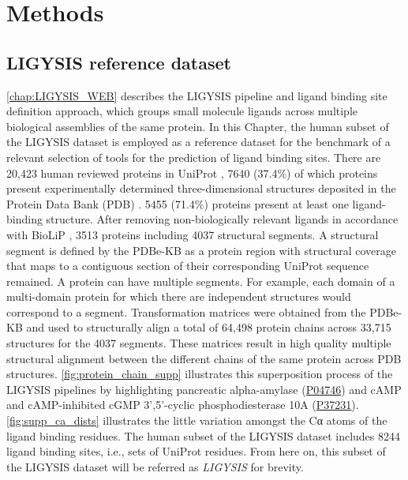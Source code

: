 \section{Methods}

\subsection{LIGYSIS reference dataset}

\autoref{chap:LIGYSIS_WEB} describes the LIGYSIS pipeline and ligand binding site definition approach, which groups small molecule ligands across multiple biological assemblies of the same protein. In this Chapter, the human subset of the LIGYSIS dataset is employed as a reference dataset for the benchmark of a relevant selection of tools for the prediction of ligand binding sites. There are 20,423 human reviewed proteins in UniProt \cite{UNIPROT_2019_UNIPROT}, 7640 (37.4\%) of which proteins present experimentally determined three-dimensional structures deposited in the Protein Data Bank (PDB) \cite{ARMSTRONG_2020_PDBE}. 5455 (71.4\%) proteins present at least one ligand-binding structure. After removing non-biologically relevant ligands in accordance with BioLiP \cite{YANG_2013_BIOLIP}, 3513 proteins including 4037 structural segments. A structural segment is defined by the PDBe-KB as a protein region with structural coverage that maps to a contiguous section of their corresponding UniProt sequence remained. A protein can have multiple segments. For example, each domain of a multi-domain protein for which there are independent structures would correspond to a segment. Transformation matrices were obtained from the PDBe-KB \cite{PDBE_2022_PDBEKB} and used to  structurally align a total of 64,498 protein chains across 33,715 structures for the 4037 segments. These matrices result in high quality multiple structural alignment between the different chains of the same protein across PDB structures. \autoref{fig:protein_chain_supp} illustrates this superposition process of the LIGYSIS pipelines by highlighting pancreatic alpha-amylase (\href{https://www.uniprot.org/uniprotkb/P04746/entry}{P04746}) and cAMP and cAMP-inhibited cGMP 3',5'-cyclic phosphodiesterase 10A (\href{https://www.uniprot.org/uniprotkb/P37231/entry}{P37231}). \autoref{fig:supp_ca_dists} illustrates the little variation amongst the Cα atoms of the ligand binding residues. The human subset of the LIGYSIS dataset includes 8244 ligand binding sites, i.e., sets of UniProt residues. From here on, this subset of the LIGYSIS dataset will be referred as \textit{LIGYSIS} for brevity.

